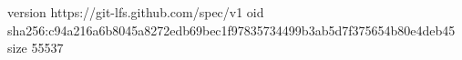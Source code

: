 version https://git-lfs.github.com/spec/v1
oid sha256:c94a216a6b8045a8272edb69bec1f97835734499b3ab5d7f375654b80e4deb45
size 55537
